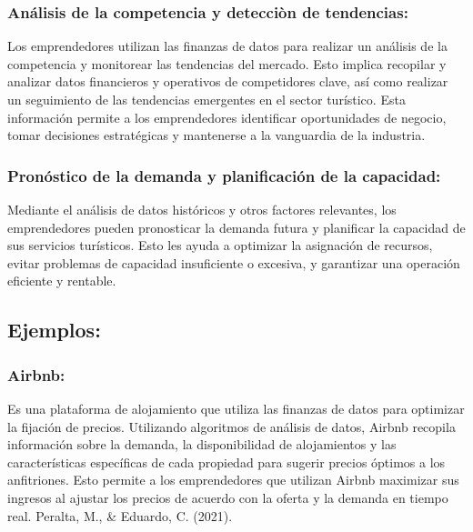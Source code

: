 \documentclass[
  letterpaper,
  DIV=11,
  numbers=noendperiod]{scrreprt}
\begin{document}
\hypertarget{anuxe1lisis-de-la-competencia-y-detecciuxf2n-de-tendencias}{%
\subsubsection{Análisis de la competencia y detecciòn de
tendencias:}\label{anuxe1lisis-de-la-competencia-y-detecciuxf2n-de-tendencias}}

Los emprendedores utilizan las finanzas de datos para realizar un
análisis de la competencia y monitorear las tendencias del mercado. Esto
implica recopilar y analizar datos financieros y operativos de
competidores clave, así como realizar un seguimiento de las tendencias
emergentes en el sector turístico. Esta información permite a los
emprendedores identificar oportunidades de negocio, tomar decisiones
estratégicas y mantenerse a la vanguardia de la industria.

\hypertarget{pronuxf3stico-de-la-demanda-y-planificaciuxf3n-de-la-capacidad}{%
\subsubsection{Pronóstico de la demanda y planificación de la
capacidad:}\label{pronuxf3stico-de-la-demanda-y-planificaciuxf3n-de-la-capacidad}}

Mediante el análisis de datos históricos y otros factores relevantes,
los emprendedores pueden pronosticar la demanda futura y planificar la
capacidad de sus servicios turísticos. Esto les ayuda a optimizar la
asignación de recursos, evitar problemas de capacidad insuficiente o
excesiva, y garantizar una operación eficiente y rentable.

\hypertarget{ejemplos}{%
\subsection{Ejemplos:}\label{ejemplos}}

\hypertarget{airbnb}{%
\subsubsection{Airbnb:}\label{airbnb}}

Es una plataforma de alojamiento que utiliza las finanzas de datos para
optimizar la fijación de precios. Utilizando algoritmos de análisis de
datos, Airbnb recopila información sobre la demanda, la disponibilidad
de alojamientos y las características específicas de cada propiedad para
sugerir precios óptimos a los anfitriones. Esto permite a los
emprendedores que utilizan Airbnb maximizar sus ingresos al ajustar los
precios de acuerdo con la oferta y la demanda en tiempo real. Peralta,
M., \& Eduardo, C. (2021).
\end{document}
